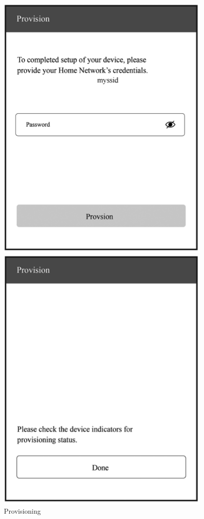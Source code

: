 \documentclass[a4paper,12pt,openany]{book}
\begin{document}
\begin{figure}[!h]
  \Centering
  \begin{minipage}[b]{0.4\textwidth}
    \includegraphics[width=0.95\textwidth]{D7Z/7-37}
    \caption{Provisioning}
  \end{minipage}\hspace{1em}
  \begin{minipage}[b]{0.4\textwidth}
    \includegraphics[width=0.95\textwidth]{D7Z/7-38}

\end{minipage}
\end{figure}
\end{document}

